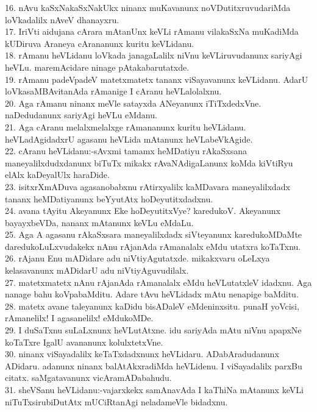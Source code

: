 \documentclass{article}
\begin{document}
16. nAvu kaSxNakaSxNakUkx ninanx muKavanunx noVDutitxruvudariMda loVkadalilx nAveV dhanayxru.\\ 
17. IriVti aidujana cArara mAtanUnx keVLi rAmanu vilakaSxNa muKadiMda kUDiruva Araneya cArananunx kuritu keVLidanu.\\
18. rAmanu heVLidanu loVkada janagaLalilx niVnu keVLiruvudanunx sariyAgi heVLu. maremAcidare ninage pAtakabarutatxde.\\
19. rAmanu padeVpadeV matetxmatetx tananx viSayavanunx keVLidanu. AdarU loVkasaMBAvitanAda rAmanige I cAranu heVLalolalxnu.\\
20. Aga rAmanu ninanx meVle satayxda ANeyanunx iTiTxdedxVne. naDedudanunx sariyAgi heVLu eMdanu.\\
21. Aga cAranu melalxmelalxge rAmananunx kuritu heVLidanu. heVLadAgidadxrU agasanu heVLida mAtanunx heVLabeVkAgide.\\
22. cAranu heVLidanu:-sAvxmi tamamx heMDatiyu rAkaSxsana maneyalilxdudxdanunx biTuTx mikakx rAvaNAdigaLanunx koMda kiVtiRyu elAlx kaDeyalUlx haraDide.\\
23. isitxrXmADuva agasanobabxnu rAtirxyalilx kaMDavara maneyalilxdadx tananx heMDatiyanunx beYyutAtx hoDeyutitxdadxnu.\\
24. avana tAyitu Akeyanunx Eke hoDeyutitxVye? karedukoV. Akeyanunx bayayxbeVDa, nananx mAtanunx keVLu eMdaLu.\\
25. Aga A agasanu rAkaSxsara maneyalilxdadx siVteyanunx karedukoMDaMte daredukoLuLxvudakekx nAnu rAjanAda rAmanalalx eMdu utatxra koTaTxnu.\\
26. rAjanu Enu mADidare adu niVtiyAgutatxde. mikakxvaru oLeLxya kelasavanunx mADidarU adu niVtiyAguvudilalx.\\
27. matetxmatetx nAnu rAjanAda rAmanalalx eMdu heVLutatxleV idadxnu. Aga nanage bahu koVpabaMditu. Adare tAvu heVLidadx mAtu nenapige baMditu.\\
28. matetx avane taleyanunx kaDidu bisADaleV eMdeninxsitu. punaH yoVcisi, rAmanelilx! I agasanelilx! eMdukoMDe.\\
29. I duSaTxnu suLaLxnunx heVLutAtxne. idu sariyAda mAtu niVnu apapxNe koTaTxre IgalU avananunx kolulxtetxVne.\\
30. ninanx viSayadalilx keTaTxdadxnunx heVLidaru. ADabAradudanunx ADidaru. adanunx ninanx balAtAkxradiMda heVLidenu. I viSayadalilx parxBu citatx. saMgatavanunx vicAramADabahudu.\\
31. sheVSanu heVLidanu:-vajarxkekx samAnavAda I kaThiNa mAtanunx keVLi niTuTxsirubiDutAtx mUCiRtanAgi neladameVle bidadxnu.\\
\end{document}
